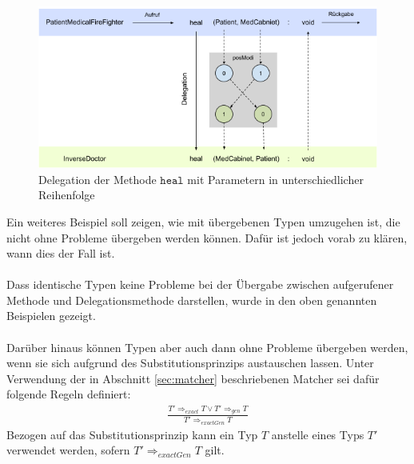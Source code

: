 \documentclass[a4paper,12pt]{article}
\begin{document}
\begin{figure}[H]
\includegraphics[width=\linewidth]{MDEL_healInverse}
\caption{Delegation der Methode $\texttt{heal}$ mit Parametern in unterschiedlicher Reihenfolge}
\label{fig:DEL_healInverse}
\end{figure}
\noindent
Ein weiteres Beispiel soll zeigen, wie mit übergebenen Typen umzugehen ist, die nicht ohne Probleme übergeben werden können. Dafür ist jedoch vorab zu klären, wann dies der Fall ist.\\\\
Dass identische Typen keine Probleme bei der Übergabe zwischen aufgerufener Methode und Delegationsmethode darstellen, wurde in den oben genannten Beispielen gezeigt.\\\\
Darüber hinaus können Typen aber auch dann ohne Probleme übergeben werden, wenn sie sich aufgrund des Substitutionsprinzips austauschen lassen. Unter Verwendung der in Abschnitt \ref{sec:matcher} beschriebenen Matcher sei dafür folgende Regeln definiert:
\begin{gather*}
\frac{T' \Rightarrow_{exact} T \vee T' \Rightarrow_{gen} T}{T' \Rightarrow_{exactGen} T }
\end{gather*}
\noindent
Bezogen auf das Substitutionsprinzip kann ein Typ $T$ anstelle eines Typs $T'$ verwendet werden, sofern $T' \Rightarrow_{exactGen} T$ gilt.
\end{document}
